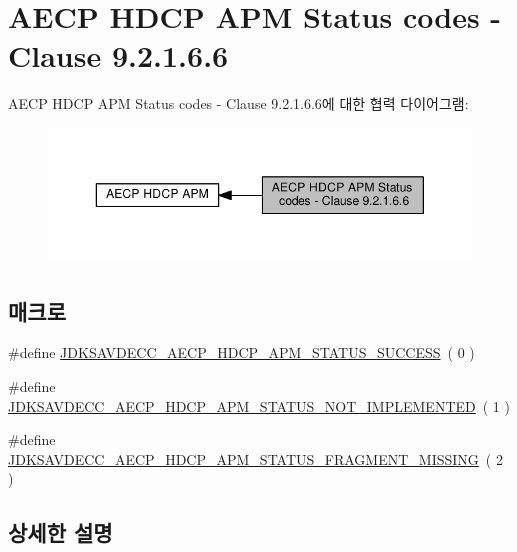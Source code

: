 \hypertarget{group__aecpdu__hdcp__apm__status}{}\section{A\+E\+CP H\+D\+CP A\+PM Status codes -\/ Clause 9.2.1.6.6}
\label{group__aecpdu__hdcp__apm__status}
A\+E\+CP H\+D\+CP A\+PM Status codes -\/ Clause 9.2.1.6.6에 대한 협력 다이어그램\+:
\nopagebreak
\begin{figure}[H]
\begin{center}
\leavevmode
\includegraphics[width=350pt]{group__aecpdu__hdcp__apm__status}
\end{center}
\end{figure}
\subsection*{매크로}
\begin{DoxyCompactItemize}
\item 
\#define \hyperlink{group__aecpdu__hdcp__apm__status_ga830802907e2a433a58b74c12928708b5}{J\+D\+K\+S\+A\+V\+D\+E\+C\+C\+\_\+\+A\+E\+C\+P\+\_\+\+H\+D\+C\+P\+\_\+\+A\+P\+M\+\_\+\+S\+T\+A\+T\+U\+S\+\_\+\+S\+U\+C\+C\+E\+SS}~( 0 )
\item 
\#define \hyperlink{group__aecpdu__hdcp__apm__status_ga86156abbaf3bacf6adf0b0449905e131}{J\+D\+K\+S\+A\+V\+D\+E\+C\+C\+\_\+\+A\+E\+C\+P\+\_\+\+H\+D\+C\+P\+\_\+\+A\+P\+M\+\_\+\+S\+T\+A\+T\+U\+S\+\_\+\+N\+O\+T\+\_\+\+I\+M\+P\+L\+E\+M\+E\+N\+T\+ED}~( 1 )
\item 
\#define \hyperlink{group__aecpdu__hdcp__apm__status_ga44c6d522ec9b30b4f566425532377b43}{J\+D\+K\+S\+A\+V\+D\+E\+C\+C\+\_\+\+A\+E\+C\+P\+\_\+\+H\+D\+C\+P\+\_\+\+A\+P\+M\+\_\+\+S\+T\+A\+T\+U\+S\+\_\+\+F\+R\+A\+G\+M\+E\+N\+T\+\_\+\+M\+I\+S\+S\+I\+NG}~( 2 )
\end{DoxyCompactItemize}


\subsection{상세한 설명}


